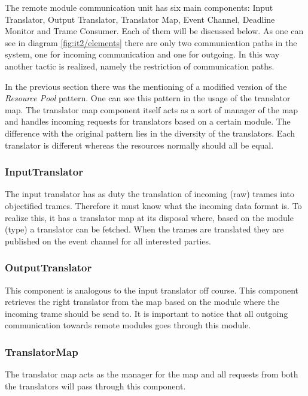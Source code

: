 \npar The remote module communication unit has six main components: Input
Translator, Output Translator, Translator Map, Event Channel, Deadline Monitor
and Trame Consumer. Each of them will be discussed below. As one can see in
diagram \ref{fig:it2/elements} there are only two communication paths
in the system, one for incoming communication and one for outgoing. In this way
another tactic is realized, namely the restriction of communication paths.

\npar In the previous section there was the mentioning of a modified version of
the \emph{Resource Pool} pattern. One can see this pattern in the usage of the
translator map. The translator map component itself acts as a sort of manager of
the map and handles incoming requests for translators based on a certain module.
The difference with the original pattern lies in the diversity of the
translators. Each translator is different whereas the resources normally should
all be equal.

\subsubsection{InputTranslator}

\npar The input translator has as duty the translation of incoming (raw) trames
into objectified trames. Therefore it must know what the incoming data format
is. To realize this, it has a translator map at its disposal where, based on
the module (type) a translator can be fetched. When the trames are translated
they are published on the event channel for all interested parties.

\subsubsection{OutputTranslator}

\npar This component is analogous to the input translator off course. This
component retrieves the right translator from the map based on the module
where the incoming trame should be send to. It is important to notice that all
outgoing communication towards remote modules goes through this module.

\subsubsection{TranslatorMap}

\npar The translator map acts as the manager for the map and all requests from
both the translators will pass through this component. 

